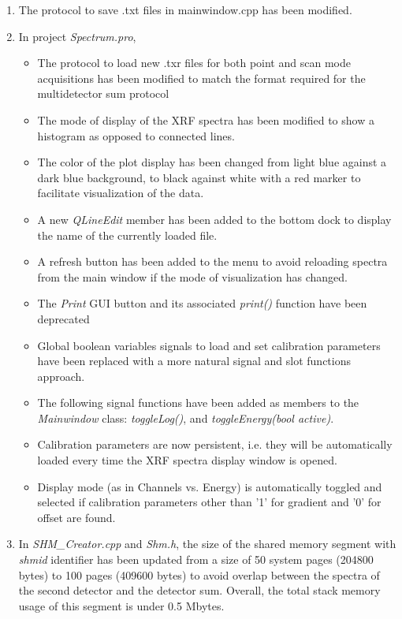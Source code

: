 \documentclass[a4paper,12pt]{article}
\begin{document}
\begin{enumerate}
	\item The protocol to save .txt files in mainwindow.cpp has been modified.
	\item In project \textit{Spectrum.pro},
	\begin{itemize}
		\item The protocol to load new .txr files for both point and scan mode acquisitions has been modified to match the format required for the multidetector sum protocol
		\item The mode of display of the XRF spectra has been modified to show a histogram as opposed to connected lines.
		\item The color of the plot display has been changed from light blue against a dark blue background, to black against white with a red marker to facilitate visualization of the data.
		\item A new \textit{QLineEdit} member has been added to the bottom dock to display the name of the currently loaded file.
		\item A refresh button has been added to the menu to avoid reloading spectra from the main window if the mode of visualization has changed.
		\item The \textit{Print} GUI button and its associated \textit{print()} function have been deprecated
		\item Global boolean variables  signals to load and set calibration parameters have been replaced with a more natural signal and slot functions approach.
		\item The following signal functions have been added as members to the \textit{Mainwindow} class: \textit{toggleLog()}, and \textit{toggleEnergy(bool active)}.
		\item Calibration parameters are now persistent, i.e. they will be automatically loaded every time the XRF spectra display window is opened.
		\item Display mode (as in Channels vs. Energy) is automatically toggled and selected if calibration parameters other than '1' for gradient and '0' for offset are found.
	\end{itemize}
	\item In \textit{SHM\_Creator.cpp} and \textit{Shm.h}, the size of the shared memory segment with \textit{shmid} identifier has been updated from a size of 50 system pages (204800 bytes) to 100 pages (409600 bytes) to avoid overlap between the spectra of the second detector and the detector sum. Overall, the total stack memory usage of this segment is under 0.5 Mbytes.

\end{enumerate}
\end{document}
